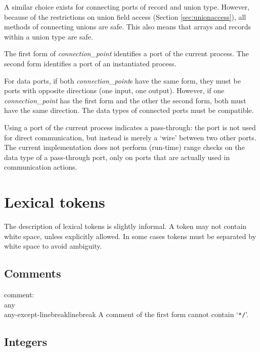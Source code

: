 A similar choice exists for connecting ports of record and union type.
However, because of the restrictions on union field access (Section \ref{sec:unionaccess}),
all methods of connecting unions are safe.  This also means that arrays and
records within a union type are safe.

The first form of {\it{}connection\_point} identifies a port of the current
process. The second form identifies a port of an instantiated process.

For data ports, if both {\it{}connection\_point}s have the same form, they
must be ports with opposite directions (one input, one output). However,
if one {\it{}connection\_point} has the first form and the other the
second form, both must have the same direction. The data types of
connected ports must be compatible.

Using a port of the current process indicates a pass-through: the port
is not used for direct communication, but instead is merely a `wire' between
two other ports. The current implementation does not perform (run-time)
range checks on the data type of a pass-through port, only on ports that
are actually used in communication actions.


\section{Lexical tokens}\label{sec:lexical}

The description of lexical tokens is slightly informal. A token may not
contain white space, unless explicitly allowed. In some cases tokens
must be separated by white space to avoid ambiguity.


\subsection{Comments}\label{sec:comments}

\grammarstart
comment: \\
       \>{\tt{}/*} any\SERIESOPT {\tt{}*/} \\
\orbox \>{\tt{}//} any-except-linebreak\SERIESOPT linebreak
\grammarend
A comment of the first form cannot contain `{\tt{}*/}'.

\subsection{Integers}\label{sec:inttoken}

